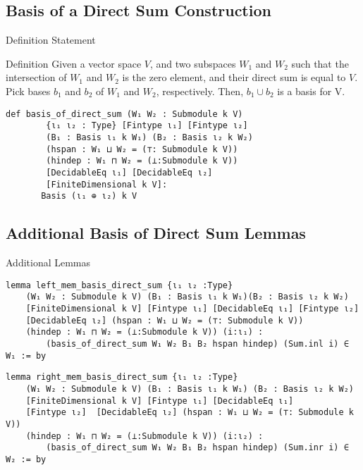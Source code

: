 \documentclass[svgnames]{beamer}
\begin{document}
\subsection{Basis of a Direct Sum Construction}
\begin{frame}[label={sec:o},fragile]{Definition Statement}

\begin{block}{Definition}
Given a vector space $V$, and two subspaces $W_1$ and $W_2$ such that the intersection of $W_1$ and $W_2$ is the zero element, and their direct sum is equal to $V$. Pick bases $b_1$ and $b_2$ of $W_1$ and $W_2$, respectively. Then, $b_1 \cup b_2$ is a basis for V. 
\end{block}

{\scriptsize
\begin{verbatim}
def basis_of_direct_sum (W₁ W₂ : Submodule k V)
        {ι₁ ι₂ : Type} [Fintype ι₁] [Fintype ι₂]
        (B₁ : Basis ι₁ k W₁) (B₂ : Basis ι₂ k W₂)
        (hspan : W₁ ⊔ W₂ = (⊤: Submodule k V))
        (hindep : W₁ ⊓ W₂ = (⊥:Submodule k V))
        [DecidableEq ι₁] [DecidableEq ι₂] 
        [FiniteDimensional k V]:
       Basis (ι₁ ⊕ ι₂) k V 
\end{verbatim}
}
\end{frame}

\subsection{Additional Basis of Direct Sum Lemmas}
\begin{frame}[label={sec:o},fragile]{Additional Lemmas}

{\tiny
\begin{verbatim}
lemma left_mem_basis_direct_sum {ι₁ ι₂ :Type}
    (W₁ W₂ : Submodule k V) (B₁ : Basis ι₁ k W₁)(B₂ : Basis ι₂ k W₂) 
    [FiniteDimensional k V] [Fintype ι₁] [DecidableEq ι₁] [Fintype ι₂]  
    [DecidableEq ι₂] (hspan : W₁ ⊔ W₂ = (⊤: Submodule k V)) 
    (hindep : W₁ ⊓ W₂ = (⊥:Submodule k V)) (i:ι₁) :
        (basis_of_direct_sum W₁ W₂ B₁ B₂ hspan hindep) (Sum.inl i) ∈ W₁ := by
\end{verbatim}

\begin{verbatim}
lemma right_mem_basis_direct_sum {ι₁ ι₂ :Type}
    (W₁ W₂ : Submodule k V) (B₁ : Basis ι₁ k W₁) (B₂ : Basis ι₂ k W₂)
    [FiniteDimensional k V] [Fintype ι₁] [DecidableEq ι₁]
    [Fintype ι₂]  [DecidableEq ι₂] (hspan : W₁ ⊔ W₂ = (⊤: Submodule k V))
    (hindep : W₁ ⊓ W₂ = (⊥:Submodule k V)) (i:ι₂) :
        (basis_of_direct_sum W₁ W₂ B₁ B₂ hspan hindep) (Sum.inr i) ∈ W₂ := by
\end{verbatim}

}

\end{frame}
\end{document}
